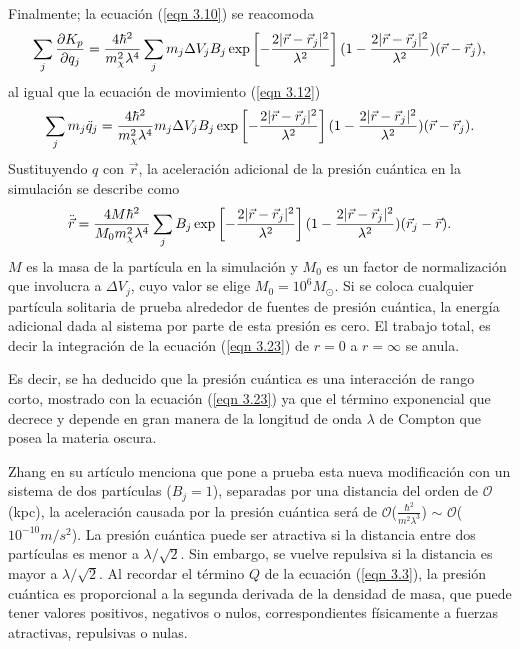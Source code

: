 \documentclass[a4paper,openright,10pt, oneside, final]{book}
\begin{document}
Finalmente; la ecuación (\ref{eqn 3.10}) se reacomoda
\begin{equation}
\footnotesize{\sum_{j} \frac{\partial K_{p}}{\partial q_{j}}
=
\frac{4\hbar^{2}}{m_{\chi}^{2}\lambda^{4}}
\sum_{j}m_{j}\Delta V_{j}B_{j}
\exp\left[
-\frac{2|\vec{r}-\vec{r}_{j}|^{2}}{\lambda^{2}}\right]
(1-\frac{2|\vec{r}-\vec{r}_{j}|^{2}}{\lambda^{2}})
(\vec{r}-\vec{r}_{j})},\label{eqn 3.21}
\end{equation}
al igual que la ecuación de movimiento (\ref{eqn 3.12})
\begin{equation}
\footnotesize{\sum_{j}m_{j}\ddot{q}_{j}
=
\frac{4\hbar^{2}}{m_{\chi}^{2}\lambda^{4}}
m_{j}\Delta V_{j}B_{j}
\exp\left[
-\frac{2|\vec{r}-\vec{r}_{j}|^{2}}{\lambda^{2}}\right]
(1-\frac{2|\vec{r}-\vec{r}_{j}|^{2}}{\lambda^{2}})
(\vec{r}-\vec{r}_{j}).}\label{eqn 3.22}
\end{equation}
Sustituyendo $q$ con $\vec{r}$, la aceleración adicional de la presión cuántica en la simulación se describe como
\begin{equation}
\footnotesize{\ddot{\vec{r}}
=
\frac{4M\hbar^{2}}{M_{0}m_{\chi}^{2}\lambda^{4}}
\sum_{j}B_{j}
\exp\left[
-\frac{2|\vec{r}-\vec{r}_{j}|^{2}}{\lambda^{2}}\right]
(1-\frac{2|\vec{r}-\vec{r}_{j}|^{2}}{\lambda^{2}})
(\vec{r}_{j}-\vec{r}).}\label{eqn 3.23}
\end{equation}
$M$ es la masa de la partícula en la simulación y $M_{0}$ es un factor de normalización que involucra a $\Delta V_{j}$, cuyo valor se elige $M_{0} = 10^{6} M_{\odot}$. Si se coloca cualquier partícula solitaria de prueba alrededor de fuentes de presión cuántica, la energía adicional dada al sistema por parte de esta presión es cero. El trabajo total, es decir la integración de la ecuación (\ref{eqn 3.23}) de $r=0$ a $r=\infty$ se anula. 

Es decir, se ha deducido que la presión cuántica es una interacción de rango corto, mostrado con la ecuación (\ref{eqn 3.23}) ya que el término exponencial que decrece y depende en gran manera de la longitud de onda $\lambda$ de Compton que posea la materia oscura.

Zhang en su artículo menciona que pone a prueba esta nueva modificación con un sistema de dos partículas ($B_{j}=1$), separadas por una distancia del orden de $\mathcal{O}$(kpc), la aceleración causada por la presión cuántica será de $\mathcal{O}$($\frac{\hbar^{2}}{m^{2}\lambda^{3}}$) $\sim$ $\mathcal{O}$($10^{-10}m/s^{2}$). La presión cuántica puede ser atractiva si la distancia entre dos partículas es menor a $\lambda/\sqrt{2}$. Sin embargo, se vuelve repulsiva si la distancia es mayor a $\lambda/\sqrt{2}$. Al recordar el término $Q$ de la ecuación (\ref{eqn 3.3}), la presión cuántica es proporcional a la segunda derivada de la densidad de masa, que puede tener valores positivos, negativos o nulos, correspondientes físicamente a fuerzas atractivas, repulsivas o nulas. 
\end{document}

